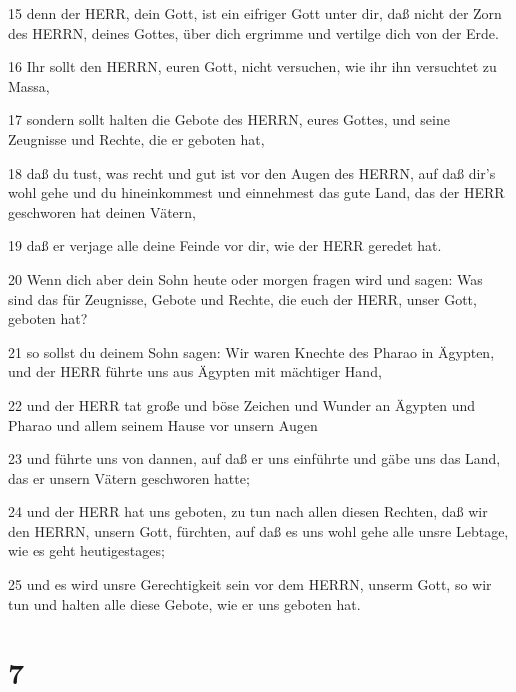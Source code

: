\par 15 denn der HERR, dein Gott, ist ein eifriger Gott unter dir, daß nicht der Zorn des HERRN, deines Gottes, über dich ergrimme und vertilge dich von der Erde.
\par 16 Ihr sollt den HERRN, euren Gott, nicht versuchen, wie ihr ihn versuchtet zu Massa,
\par 17 sondern sollt halten die Gebote des HERRN, eures Gottes, und seine Zeugnisse und Rechte, die er geboten hat,
\par 18 daß du tust, was recht und gut ist vor den Augen des HERRN, auf daß dir's wohl gehe und du hineinkommest und einnehmest das gute Land, das der HERR geschworen hat deinen Vätern,
\par 19 daß er verjage alle deine Feinde vor dir, wie der HERR geredet hat.
\par 20 Wenn dich aber dein Sohn heute oder morgen fragen wird und sagen: Was sind das für Zeugnisse, Gebote und Rechte, die euch der HERR, unser Gott, geboten hat?
\par 21 so sollst du deinem Sohn sagen: Wir waren Knechte des Pharao in Ägypten, und der HERR führte uns aus Ägypten mit mächtiger Hand,
\par 22 und der HERR tat große und böse Zeichen und Wunder an Ägypten und Pharao und allem seinem Hause vor unsern Augen
\par 23 und führte uns von dannen, auf daß er uns einführte und gäbe uns das Land, das er unsern Vätern geschworen hatte;
\par 24 und der HERR hat uns geboten, zu tun nach allen diesen Rechten, daß wir den HERRN, unsern Gott, fürchten, auf daß es uns wohl gehe alle unsre Lebtage, wie es geht heutigestages;
\par 25 und es wird unsre Gerechtigkeit sein vor dem HERRN, unserm Gott, so wir tun und halten alle diese Gebote, wie er uns geboten hat.

\chapter{7}

